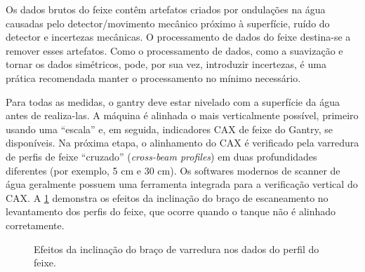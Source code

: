\documentclass[11pt,a4paper]{article}
\newcounter{exemplo}
\begin{document}
	Os dados brutos do feixe contêm artefatos criados por ondulações na água causadas pelo detector/movimento mecânico próximo à superfície, ruído do detector e incertezas mecânicas. O processamento de dados do feixe destina-se a remover esses artefatos. Como o processamento de dados, como a suavização e tornar os dados simétricos, pode, por sua vez, introduzir incertezas, é uma prática recomendada manter o processamento no mínimo necessário.

	Para todas as medidas, o gantry deve estar nivelado com a superfície da água antes de realiza-las. A máquina é alinhada o mais verticalmente possível, primeiro usando uma ``escala'' e, em seguida, indicadores CAX de feixe do Gantry, se disponíveis. Na próxima etapa, o alinhamento do CAX é verificado pela varredura de perfis de feixe ``cruzado'' (\textit{cross-beam profiles}) em duas profundidades diferentes (por exemplo, 5 cm e 30 cm). Os softwares modernos de scanner de água geralmente possuem uma ferramenta integrada para a verificação vertical do CAX. A \ref{fig:scanningArmTilt} demonstra os efeitos da inclinação do braço de escaneamento no levantamento dos perfis do feixe, que ocorre quando o tanque não é alinhado corretamente.

	\begin{figure}[h]
		\centering
		\caption{Efeitos da inclinação do braço de varredura nos dados do perfil do feixe.}
		\label{fig:scanningArmTilt}
	\end{figure}
\end{document}
